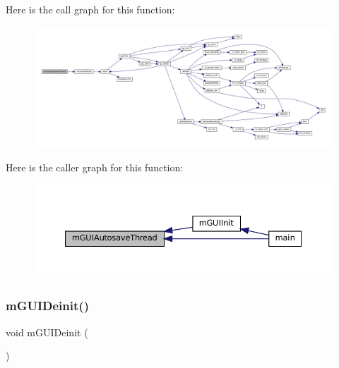 Here is the call graph for this function\+:
\nopagebreak
\begin{figure}[H]
\begin{center}
\leavevmode
\includegraphics[width=350pt]{gui-runner_8h_a893aeb86364bda67a415a000c4a690d6_cgraph}
\end{center}
\end{figure}
Here is the caller graph for this function\+:
\nopagebreak
\begin{figure}[H]
\begin{center}
\leavevmode
\includegraphics[width=350pt]{gui-runner_8h_a893aeb86364bda67a415a000c4a690d6_icgraph}
\end{center}
\end{figure}
\mbox{\label{gui-runner_8h_a5d0bba06810ebab1134e6d5d26d46767}} 
\subsubsection{\texorpdfstring{m\+G\+U\+I\+Deinit()}{mGUIDeinit()}}
{\footnotesize\ttfamily void m\+G\+U\+I\+Deinit (\begin{DoxyParamCaption}\item[{struct \mbox{\hyperlink{structm_g_u_i_runner}{m\+G\+U\+I\+Runner}} $\ast$}]{ }\end{DoxyParamCaption})}

